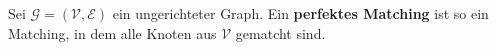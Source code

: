 \begin{definition}\label{def:perfect-matching}
Sei $\mathcal{G} = (\mathcal{V}, \mathcal{E})$ ein ungerichteter Graph. Ein \textbf{perfektes Matching} 
 ist so ein Matching, in dem alle Knoten aus $\mathcal{V}$ gematcht sind.
\end{definition}
